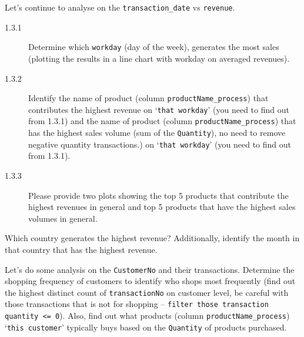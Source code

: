 \documentclass[a4paper]{article}
\begin{document}
    \begin{answer}[Question 1.3]
    Let's continue to analyse on the \texttt{transaction_date} vs \texttt{revenue}.
    \begin{description}
        \item[1.3.1] Determine which \texttt{workday} (day of the week),
  generates the most sales (plotting the results in a line chart with workday on averaged revenues).
        \item[1.3.2] Identify the name of product (column \texttt{productName_process}) that contributes the highest revenue on `\texttt{that workday}' (you need to find out from 1.3.1) and the name of product (column \texttt{productName_process}) that has the highest sales volume (sum of the \texttt{Quantity}), no need to remove negative quantity transactions.) on `\texttt{that workday}' (you need to find out from 1.3.1).
        \item[1.3.3] Please provide two plots showing the top 5 products that contribute the highest revenues in general and top 5 products that have the highest sales volumes in general.
    \end{description}

    \end{answer}

    \begin{answer}[Question 1.4]
    Which country generates the highest revenue? Additionally, identify the month in that country that has the highest revenue.
    \end{answer}

    \begin{answer}[Question 1.5]
    Let's do some analysis on the \texttt{CustomerNo} and their transactions.
    Determine the shopping frequency of customers to identify who shops most frequently (find out the highest distinct count of \texttt{transactionNo} on customer level, be careful with those transactions that is not for shopping -- \texttt{filter those transaction quantity <= 0}). Also, find out what products (column \texttt{productName_process}) `\texttt{this customer}' typically buys based on the \texttt{Quantity} of products purchased.

    \end{answer}
\end{document}
